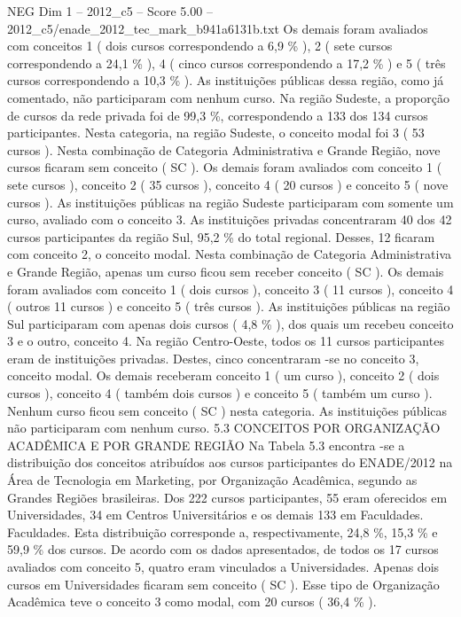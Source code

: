\begin{textsample}{NEG Dim 1 – 2012\_c5 – Score 5.00 – 2012\_c5/enade\_2012\_tec\_mark\_b941a6131b.txt}
Os demais foram avaliados com conceitos 1 ( dois cursos correspondendo a 6,9 \% ), 2 ( sete cursos correspondendo a 24,1 \% ), 4 ( cinco cursos correspondendo a 17,2 \% ) e 5 ( três cursos correspondendo a 10,3 \% ).
As instituições públicas dessa região, como já comentado, não participaram com nenhum curso.
Na região Sudeste, a proporção de cursos da rede privada foi de 99,3 \%, correspondendo a 133 dos 134 cursos participantes.
Nesta categoria, na região Sudeste, o conceito modal foi 3 ( 53 cursos ).
Nesta combinação de Categoria Administrativa e Grande Região, nove cursos ficaram sem conceito ( SC ).
Os demais foram avaliados com conceito 1 ( sete cursos ), conceito 2 ( 35 cursos ), conceito 4 ( 20 cursos ) e conceito 5 ( nove cursos ).
As instituições públicas na região Sudeste participaram com somente um curso, avaliado com o conceito 3.
As instituições privadas concentraram 40 dos 42 cursos participantes da região Sul, 95,2 \% do total regional.
Desses, 12 ficaram com conceito 2, o conceito modal.
Nesta combinação de Categoria Administrativa e Grande Região, apenas um curso ficou sem receber conceito ( SC ).
Os demais foram avaliados com conceito 1 ( dois cursos ), conceito 3 ( 11 cursos ), conceito 4 ( outros 11 cursos ) e conceito 5 ( três cursos ).
As instituições públicas na região Sul participaram com apenas dois cursos ( 4,8 \% ), dos quais um recebeu conceito 3 e o outro, conceito 4.
Na região Centro-Oeste, todos os 11 cursos participantes eram de instituições privadas.
Destes, cinco concentraram -se no conceito 3, conceito modal.
Os demais receberam conceito 1 ( um curso ), conceito 2 ( dois cursos ), conceito 4 ( também dois cursos ) e conceito 5 ( também um curso ).
Nenhum curso ficou sem conceito ( SC ) nesta categoria.
As instituições públicas não participaram com nenhum curso. 5.3 CONCEITOS POR ORGANIZAÇÃO ACADÊMICA E POR GRANDE REGIÃO Na Tabela 5.3 encontra -se a distribuição dos conceitos atribuídos aos cursos participantes do ENADE/2012 na Área de Tecnologia em Marketing, por Organização Acadêmica, segundo as Grandes Regiões brasileiras.
Dos 222 cursos participantes, 55 eram oferecidos em Universidades, 34 em Centros Universitários e os demais 133 em Faculdades.
Faculdades.
Esta distribuição corresponde a, respectivamente, 24,8 \%, 15,3 \% e 59,9 \% dos cursos.
De acordo com os dados apresentados, de todos os 17 cursos avaliados com conceito 5, quatro eram vinculados a Universidades.
Apenas dois cursos em Universidades ficaram sem conceito ( SC ).
Esse tipo de Organização Acadêmica teve o conceito 3 como modal, com 20 cursos ( 36,4 \% ).

\end{textsample}
